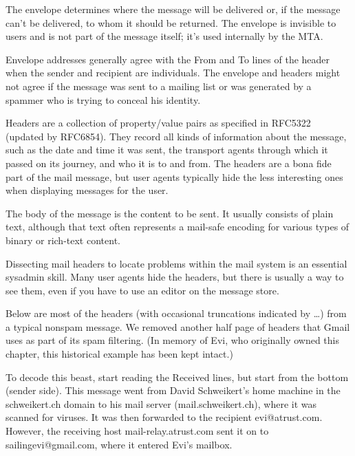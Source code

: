 \protect\hypertarget{part0026_split_008.htmlux5cux23_idIndexMarker2423}{}{}The
envelope determines where the message will be delivered or, if the
message can't be delivered, to whom it should be returned. The envelope
is invisible to users and is not part of the message itself; it's used
internally by the MTA.

\protect\hypertarget{part0026_split_008.htmlux5cux23_idIndexMarker2424}{}{}\protect\hypertarget{part0026_split_008.htmlux5cux23_idIndexMarker2425}{}{}Envelope
addresses generally agree with the From and To lines of the header when
the sender and recipient are individuals. The envelope and headers might
not agree if the message was sent to a mailing list or was generated by
a spammer who is trying to conceal his identity.

Headers are a collection of property/value pairs as specified in RFC5322
(updated by RFC6854). They record all kinds of information about the
message, such as the date and time it was sent, the transport agents
through which it passed on its journey, and who it is to and from. The
headers are a bona fide part of the mail message, but user agents
typically hide the less interesting ones when displaying messages for
the user.

The body of the message is the content to be sent. It usually consists
of plain text, although that text often represents a mail-safe encoding
for various types of binary or rich-text content.

Dissecting mail headers to locate problems within the mail system is an
essential sysadmin skill. Many user agents hide the headers, but there
is usually a way to see them, even if you have to use an editor on the
message store.

Below are most of the headers (with occasional truncations indicated by
\ldots) from a typical nonspam message. We removed another half page of
headers that Gmail uses as part of its spam filtering. (In memory of
Evi, who originally owned this chapter, this historical example has been
kept intact.)


To decode this beast, start reading the Received lines, but start from
the bottom (sender side). This message went from David Schweikert's home
machine in the schweikert.ch domain to his mail server
(mail.schweikert.ch), where it was scanned for viruses. It was then
forwarded to the recipient evi@atrust.com. However, the receiving host
mail-relay.atrust.com sent it on to sailingevi@gmail.com, where it
entered Evi's mailbox.


